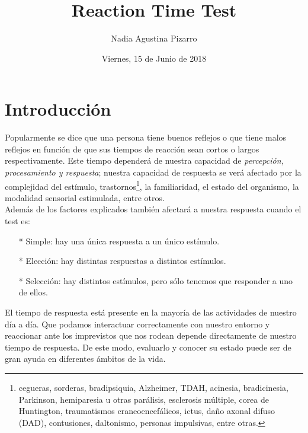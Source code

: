 \documentclass[11pt,a4paper,twocolumn]{article}
\author{Nadia Agustina Pizarro}
\title{\textbf{Reaction Time Test}}
\date {\small{Viernes, 15 de Junio de 2018}}       %
\begin{document}
\section*{Introducción}
	Popularmente se dice que una persona tiene buenos reflejos o que tiene malos reflejos en función de que sus tiempos de reacción sean cortos o largos respectivamente. Este tiempo dependerá de nuestra capacidad de \emph{percepción, procesamiento y respuesta}; nuestra capacidad de respuesta se verá afectado por la complejidad del estímulo, trastornos\footnote{cegueras, sorderas, bradipsiquia, Alzheimer, TDAH, acinesia, bradicinesia, Parkinson, hemiparesia u otras parálisis, esclerosis múltiple, corea de Huntington, traumatismos craneoencefálicos, ictus, daño axonal difuso (DAD), contusiones, daltonismo, personas impulsivas, entre otras.}, la familiaridad, el estado del organismo, la modalidad sensorial estimulada, entre otros.\\
Además de los factores explicados también afectará a nuestra respuesta cuando el test
es:
\begin{itemize}
\item[*] Simple: hay una única respuesta a un único estímulo.
\item[*] Elección: hay distintas respuestas a distintos estímulos.
\item[*] Selección: hay distintos estímulos, pero sólo tenemos que responder a uno de ellos.
\end{itemize}
El tiempo de respuesta está presente en la mayoría de las actividades de nuestro día a día. Que podamos interactuar correctamente con nuestro entorno y reaccionar ante los imprevistos que nos rodean depende directamente de nuestro tiempo de respuesta. De este modo, evaluarlo y conocer su estado puede ser de gran ayuda en diferentes ámbitos de la vida.
\end{document}
